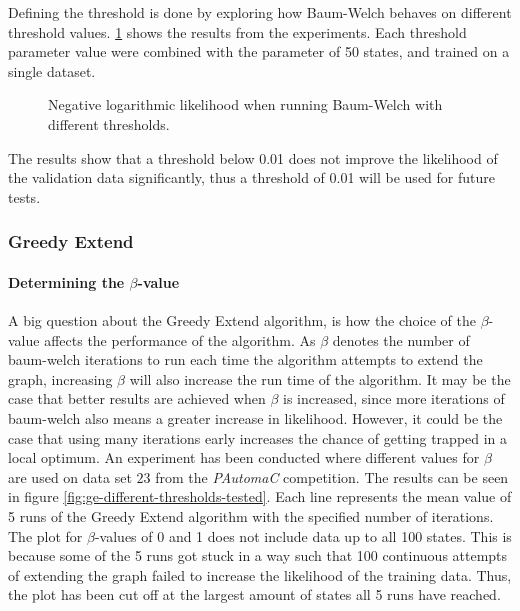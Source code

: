 Defining the threshold is done by exploring how Baum-Welch behaves on different threshold values. \ref{fig:threshold} shows the results from the experiments. Each threshold parameter value were combined with the parameter of 50 states, and trained on a single dataset.

\begin{figure}
\centering
\caption{Negative logarithmic likelihood when running Baum-Welch with different thresholds.}
\label{fig:threshold}
\end{figure}

The results show that a threshold below 0.01 does not improve the likelihood of the validation data significantly, thus a threshold of 0.01 will be used for future tests.

\subsubsection{Greedy Extend}
\label{sec:greedy}
\paragraph{Determining the $\beta$-value}
A big question about the Greedy Extend algorithm, is how the choice of the $\beta$-value affects the performance of the algorithm.
As $\beta$ denotes the number of \gls{baum-welch} iterations to run each time the algorithm attempts to extend the graph, increasing $\beta$ will also increase the run time of the algorithm. It may be the case that better results are achieved when $\beta$ is increased, since more iterations of \gls{baum-welch} also means a greater increase in likelihood. However, it could be the case that using many iterations early increases the chance of getting trapped in a local optimum.
An experiment has been conducted where different values for $\beta$ are used on data set $23$ from the \emph{PAutomaC} competition. The results can be seen in figure \ref{fig:ge-different-thresholds-tested}. Each line represents the mean value of 5 runs of the Greedy Extend algorithm with the specified number of iterations. The plot for $\beta$-values of 0 and 1 does not include data up to all 100 states. This is because some of the 5 runs got stuck in a way such that 100 continuous attempts of extending the graph failed to increase the likelihood of the training data. Thus, the plot has been cut off at the largest amount of states all 5 runs have reached. 

